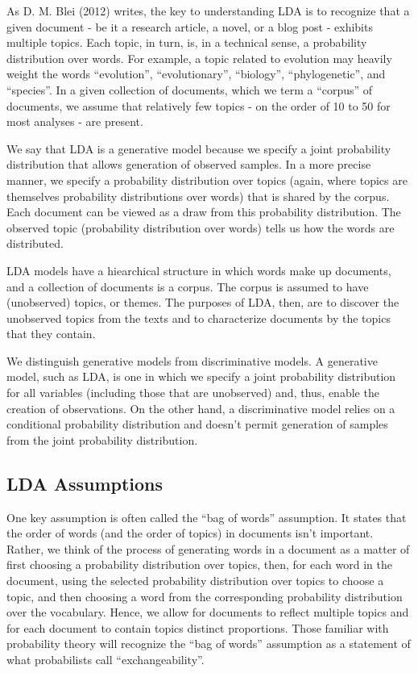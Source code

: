 \documentclass[12pt,]{article}
\begin{document}
As D. M. Blei (2012) writes, the key to understanding LDA is to
recognize that a given document - be it a research article, a novel, or
a blog post - exhibits multiple topics. Each topic, in turn, is, in a
technical sense, a probability distribution over words. For example, a
topic related to evolution may heavily weight the words ``evolution'',
``evolutionary'', ``biology'', ``phylogenetic'', and ``species''. In a
given collection of documents, which we term a ``corpus'' of documents,
we assume that relatively few topics - on the order of 10 to 50 for most
analyses - are present.

We say that LDA is a generative model because we specify a joint
probability distribution that allows generation of observed samples. In
a more precise manner, we specify a probability distribution over topics
(again, where topics are themselves probability distributions over
words) that is shared by the corpus. Each document can be viewed as a
draw from this probability distribution. The observed topic (probability
distribution over words) tells us how the words are distributed.

LDA models have a hiearchical structure in which words make up
documents, and a collection of documents is a corpus. The corpus is
assumed to have (unobserved) topics, or themes. The purposes of LDA,
then, are to discover the unobserved topics from the texts and to
characterize documents by the topics that they contain.

We distinguish generative models from discriminative models. A
generative model, such as LDA, is one in which we specify a joint
probability distribution for all variables (including those that are
unobserved) and, thus, enable the creation of observations. On the other
hand, a discriminative model relies on a conditional probability
distribution and doesn't permit generation of samples from the joint
probability distribution.

\subsection{LDA Assumptions}\label{lda-assumptions}

One key assumption is often called the ``bag of words'' assumption. It
states that the order of words (and the order of topics) in documents
isn't important. Rather, we think of the process of generating words in
a document as a matter of first choosing a probability distribution over
topics, then, for each word in the document, using the selected
probability distribution over topics to choose a topic, and then
choosing a word from the corresponding probability distribution over the
vocabulary. Hence, we allow for documents to reflect multiple topics and
for each document to contain topics distinct proportions. Those familiar
with probability theory will recognize the ``bag of words'' assumption
as a statement of what probabilists call ``exchangeability''.
\end{document}
